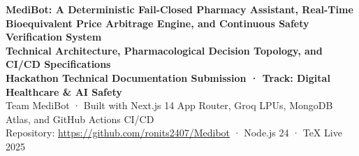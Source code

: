 \documentclass[11pt,a4paper]{article}
\begin{document}
\begin{center}
  {\Huge\textbf{\textsf{MediBot: A Deterministic Fail-Closed Pharmacy Assistant, Real-Time Bioequivalent Price Arbitrage Engine, and Continuous Safety Verification System}}}\\[1.5em]

  {\large\textbf{\textsf{Technical Architecture, Pharmacological Decision Topology, and CI/CD Specifications}}}\\[1em]

  {\normalsize\textbf{\textsf{Hackathon Technical Documentation Submission · Track: Digital Healthcare \& AI Safety}}}\\[0.6em]
  {\small\textsf{Team MediBot · Built with Next.js 14 App Router, Groq LPUs, MongoDB Atlas, and GitHub Actions CI/CD}}\\[0.4em]
  {\footnotesize\textsf{Repository: \url{https://github.com/ronits2407/Medibot} · Node.js 24 · TeX Live 2025}}
\end{center}

\vspace{0.8em}
\end{document}
